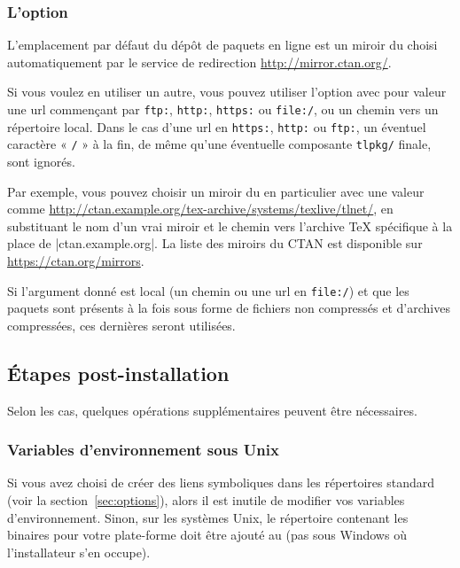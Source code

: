 \documentclass[german, english, french]{article}
\begin{document}
\subsubsection{L'option }
\label{sec:location}

L'emplacement par défaut du dépôt de paquets en ligne est un miroir du \CTAN{}
choisi automatiquement par le service de redirection
\url{http://mirror.ctan.org/}.

Si vous voulez en utiliser un autre, vous pouvez utiliser l'option
 avec pour valeur une url commençant par \texttt{ftp:},
\texttt{http:}, \texttt{https:} ou \texttt{file:/}, ou un chemin vers un
répertoire local.  Dans le cas d'une url en \texttt{https:}, \texttt{http:} ou
\texttt{ftp:}, un éventuel caractère « \texttt{/} » à la fin, de même qu'une
éventuelle composante \texttt{tlpkg/} finale, sont ignorés.

Par exemple, vous pouvez choisir un miroir du \CTAN{} en particulier avec une
valeur comme \url{http://ctan.example.org/tex-archive/systems/texlive/tlnet/},
en substituant le nom d'un vrai miroir et le chemin vers l'archive \TeX{}
spécifique à la place de |ctan.example.org|. La liste des miroirs du CTAN est
disponible sur \url{https://ctan.org/mirrors}.

Si l'argument donné est local (un chemin ou une url en \texttt{file:/}) et que
les paquets sont présents à la fois sous forme de fichiers non compressés et
d'archives compressées, ces dernières seront utilisées.

\subsection{Étapes post-installation}
\label{sec:postinstall}

Selon les cas, quelques opérations supplémentaires peuvent être nécessaires.

\subsubsection{Variables d'environnement sous Unix}
\label{sec:env}

Si vous avez choisi de créer des liens symboliques dans les répertoires standard
(voir la section~\ref{sec:options}), alors il est inutile de modifier vos
variables d'environnement. Sinon, sur les systèmes Unix, le répertoire contenant
les binaires pour votre plate-forme doit être ajouté au  (pas sous
Windows où l'installateur s'en occupe).
\end{document}
